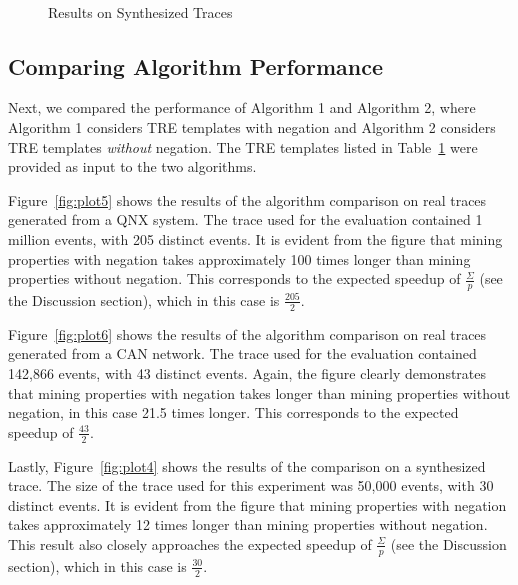 \documentclass[]{sigplanconf}
\begin{document}
\begin{figure}[!ht]
  \centering
  \\
  \caption{Results on Synthesized Traces}\label{Algs_synth}
\end{figure}


\subsection{Comparing Algorithm Performance}

Next, we compared the performance of Algorithm 1 and Algorithm 2, where Algorithm 1 considers TRE templates with negation and Algorithm 2 considers TRE templates \emph{without} negation. The TRE templates listed in Table~\ref{Algs_synth} were provided as input to the two algorithms.

Figure~\ref{fig:plot5} shows the results of the algorithm comparison on real traces generated from a QNX system. The trace used for the evaluation contained 1 million events, with 205 distinct events. It is evident from the figure that mining properties with negation takes approximately 100 times longer than mining properties without negation. This corresponds to the expected speedup of $\frac{\Sigma}{p}$ (see the Discussion section), which in this case is $\frac{205}{2}$.

Figure~\ref{fig:plot6} shows the results of the algorithm comparison on real traces generated from a CAN network. The trace used for the evaluation contained 142,866 events, with 43 distinct events. Again, the figure clearly demonstrates that mining properties with negation takes longer than mining properties without negation, in this case 21.5 times longer. This corresponds to the expected speedup of $\frac{43}{2}$.

Lastly, Figure~\ref{fig:plot4} shows the results of the comparison on a synthesized trace. The size of the trace used for this experiment was 50,000 events, with 30 distinct events. It is evident from the figure that mining properties with negation takes approximately 12 times longer than mining properties without negation. This result also closely approaches the expected speedup of $\frac{\Sigma}{p}$ (see the Discussion section), which in this case is $\frac{30}{2}$.
\end{document}
